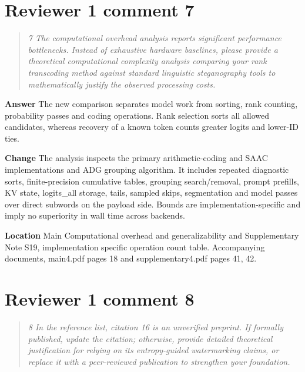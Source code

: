 \documentclass[11pt]{article}
\newenvironment{reviewcomment}{\begin{quote}\color{commentgray}\itshape}{\end{quote}}
\begin{document}
\section*{Reviewer 1 comment 7}\label{resp:R1-7}
\begin{reviewcomment}
7 The computational overhead analysis reports significant performance bottlenecks. Instead of exhaustive hardware baselines, please provide a theoretical computational complexity analysis comparing your rank transcoding method against standard linguistic steganography tools to mathematically justify the observed processing costs.
\end{reviewcomment}

\textbf{Answer} The new comparison separates model work from sorting, rank counting, probability passes and coding operations. Rank selection sorts all allowed candidates, whereas recovery of a known token counts greater logits and lower-ID ties.

\textbf{Change} The analysis inspects the primary arithmetic-coding and SAAC implementations and ADG grouping algorithm. It includes repeated diagnostic sorts, finite-precision cumulative tables, grouping search/removal, prompt prefills, KV state, logits\_all storage, tails, sampled skips, segmentation and model passes over direct subwords on the payload side. Bounds are implementation-specific and imply no superiority in wall time across backends.

\textbf{Location} Main Computational overhead and generalizability and Supplementary Note S19, implementation specific operation count table. Accompanying documents, main4.pdf pages 18 and supplementary4.pdf pages 41, 42.


\section*{Reviewer 1 comment 8}\label{resp:R1-8}
\begin{reviewcomment}
8 In the reference list, citation 16 is an unverified preprint. If formally published, update the citation; otherwise, provide detailed theoretical justification for relying on its entropy-guided watermarking claims, or replace it with a peer-reviewed publication to strengthen your foundation.
\end{reviewcomment}
\end{document}
